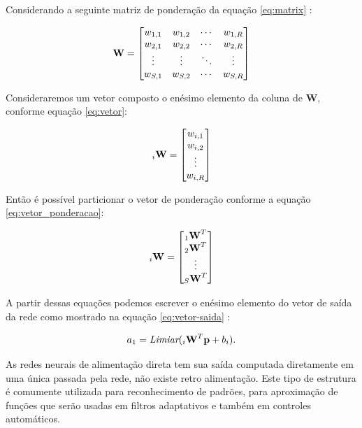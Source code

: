 \documentclass[
	12pt,				%
    oneside,			%
	a4paper,			%
	english,			%
	french,				%
	spanish,			%
	brazil,				%
	]{abntex2}
\begin{document}
Considerando a seguinte matriz de ponderação da equação \ref{eq:matrix} :

\begin{equation}
\centering
\textbf{W} ={\begin{bmatrix}
    w_{1,1} & w_{1,2} & \cdots & w_{1,R}\\
    w_{2,1} & w_{2,2} & \cdots & w_{2,R}\\
    \vdots & \vdots & \ddots & \vdots \\
    w_{S,1} & w_{S,2} & \cdots & w_{S,R}
\end{bmatrix}}
\label{eq:matrix}
\end{equation} 

Consideraremos um vetor composto o enésimo elemento da coluna de \textbf{W}, conforme equação \ref{eq:vetor}:

\begin{equation}
\centering
\textbf{$_i$W} ={\begin{bmatrix}
    w_{i,1}\\
    w_{i,2}\\
    \vdots \\
    w_{i,R}
\end{bmatrix}}
\label{eq:vetor}
\end{equation}

Então é possível particionar o vetor de ponderação conforme a equação \ref{eq:vetor_ponderacao}:

\begin{equation}
\centering
\textbf{$_i$W} ={\begin{bmatrix}
    \textbf{$_1$W}^T\\
    \textbf{$_2$W}^T\\
    \vdots \\
    \textbf{$_S$W}^T
\end{bmatrix}}
\label{eq:vetor_ponderacao}
\end{equation}

A partir dessas equações podemos escrever o enésimo elemento do vetor de saída da rede como mostrado na equação \ref{eq:vetor-saida} :

\begin{equation}
\centering
    a_1=\textit{Limiar}(\textbf{$_i$W}^T\textbf{p}+\textit{$b_i$}).
    \label{eq:vetor-saida}
\end{equation}

As redes neurais de alimentação direta tem sua saída computada diretamente em uma única passada pela rede, não existe retro alimentação. Este tipo de estrutura é comumente utilizada para reconhecimento de padrões, para aproximação de funções que serão usadas em filtros adaptativos e também em controles automáticos.
\end{document}
